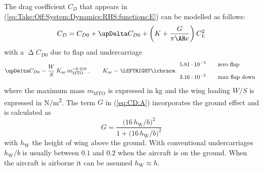 \documentclass[12pt,twoside]{book}
\begin{document}
The drag coefficient $C_D$ that appears in (\ref{eq:Take:Off:System:Dynamics:RHS:functions:E})
can be modelled as follows:
\begin{equation}\label{eq:CD:A}
C_D = C_{D0} + \upDelta C_{D0} + \left( K + \frac{G}{\pi \AR e} \right) C_L^2
\end{equation}
with a $\upDelta C_{D0}$ due to flap and undercarriage
\begin{equation}\label{eq:CD:B}
\upDelta C_{D0} = \frac{W}{S} \, K_{\text{uc}} \, m_{\text{MTO}}^{-\num{0.219}}
\;,\qquad
K_{\text{uc}} =
    \LEFTRIGHT\lcbrace.{
      \begin{array}{l@{\rule{2em}{0pt}}l} 
        \num[round-precision=2]{5.81}\cdot 10^{-5}
          & \text{zero flap}
        \\[1em]
        \num[round-precision=2]{3.16}\cdot 10^{-5}
          & \text{max flap down}
      \end{array}
    }  
\end{equation}
where the maximum mass $m_{\text{MTO}}$ is expressed in \si{kg} and the
wing loading $W/S$ is expressed in \si{N/m^2}.
The term $G$ in (\ref{eq:CD:A}) incorporates the ground effect and is calculated as
\begin{equation}\label{eq:CD:Ground:Effect}
G = \frac{\big( 16\,h_{\text{W}}/b \big)^2}{1+ \big( 16\,h_{\text{W}}/b \big)^2}
\end{equation}
with $h_{\text{W}}$ the height of wing above the ground.
With conventional undercarriages $h_{\text{W}}/b$ is usually between
$\num[round-precision=1]{0.1}$ and $\num[round-precision=1]{0.2}$ when the aircraft is on the ground.
When the aircraft is airborne it can be assumed $h_{\text{W}} \approx h$. 
\end{document}
